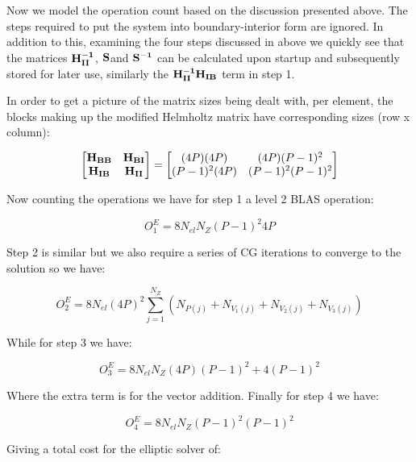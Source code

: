 Now we model the operation count based on the discussion presented above. The steps required to put the system into boundary-interior form are ignored. In addition to this, examining the four steps discussed in above we quickly see that the matrices \(\bf{H_{II}^{-1}}\), \(\bf{S}\)and \(\bf{S^{-1}}\) can be calculated upon startup and subsequently stored for later use, similarly the \(\bf{H_{II}^{-1}H_{IB}}\) term in step 1. 

In order to get a picture of the matrix sizes being dealt with, per element, the blocks making up the modified Helmholtz matrix have corresponding sizes (row x column):

\begin{equation}
\begin{bmatrix}
{\bf{H_{BB}}} &  {\bf{H_{BI}}}\\
{\bf{H_{IB}}} &  {\bf{H_{II}}} 
  \end{bmatrix}
=
\begin{bmatrix}
(4P)(4P) & (4P)(P-1)^2 \\
(P-1)^2(4P) & (P-1)^2(P-1)^2
\end{bmatrix}
\end{equation}

Now counting the operations we have for step 1 a level 2 BLAS operation:

\begin{equation}
O_1^E = 8N_{el}N_Z(P-1)^2 4P 
\end{equation}

Step 2 is similar but we also require a series of CG iterations to converge to the solution so we have:

\begin{equation}
O_2^E = 8N_{el}(4P)^2 \sum_{j=1}^{N_Z} (N_{P (j)} + N_{V_1 (j)} + N_{V_2 (j)} + N_{V_3 (j)})
\end{equation}

While for step 3 we have:

\begin{equation}
O_3^E = 8N_{el}N_Z(4P)(P-1)^2 + 4(P-1)^2
\end{equation}

Where the extra term is for the vector addition. Finally for step 4 we have:

\begin{equation}
O_4^E = 8N_{el}N_Z(P-1)^2(P-1)^2
\end{equation}

Giving a total cost for the elliptic solver of:

